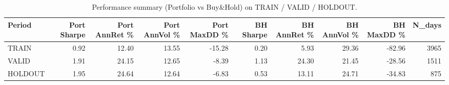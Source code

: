 \begin{table}[t]
\centering
\caption{Performance summary (Portfolio vs Buy\&Hold) on TRAIN / VALID / HOLDOUT.}
\label{tab:perf_summary}
\begin{tabular}{lrrrrrrrrr}
\toprule
Period & Port Sharpe & Port AnnRet \% & Port AnnVol \% & Port MaxDD \% & BH Sharpe & BH AnnRet \% & BH AnnVol \% & BH MaxDD \% & N\_days \\
\midrule
TRAIN & 0.92 & 12.40 & 13.55 & -15.28 & 0.20 & 5.93 & 29.36 & -82.96 & 3965 \\
VALID & 1.91 & 24.15 & 12.65 & -8.39 & 1.13 & 24.30 & 21.45 & -28.56 & 1511 \\
HOLDOUT & 1.95 & 24.64 & 12.64 & -6.83 & 0.53 & 13.11 & 24.71 & -34.83 & 875 \\
\bottomrule
\end{tabular}

\end{table}
